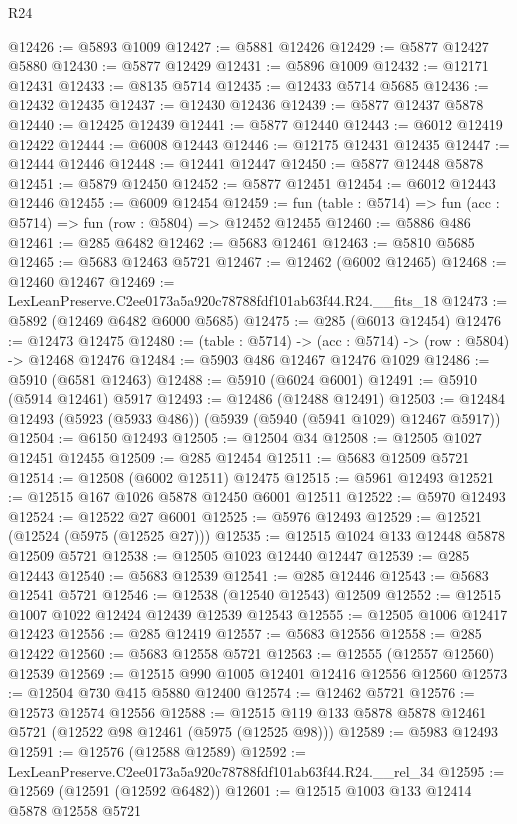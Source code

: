 \begin{lexlean}{R24}
\begin{coremodule}
@12426 := @5893 @1009
@12427 := @5881 @12426
@12429 := @5877 @12427 @5880
@12430 := @5877 @12429
@12431 := @5896 @1009
@12432 := @12171 @12431
@12433 := @8135 @5714
@12435 := @12433 @5714 @5685
@12436 := @12432 @12435
@12437 := @12430 @12436
@12439 := @5877 @12437 @5878
@12440 := @12425 @12439
@12441 := @5877 @12440
@12443 := @6012 @12419 @12422
@12444 := @6008 @12443
@12446 := @12175 @12431 @12435
@12447 := @12444 @12446
@12448 := @12441 @12447
@12450 := @5877 @12448 @5878
@12451 := @5879 @12450
@12452 := @5877 @12451
@12454 := @6012 @12443 @12446
@12455 := @6009 @12454
@12459 := fun (table : @5714) => fun (acc : @5714) => fun (row : @5804) => @12452 @12455
@12460 := @5886 @486
@12461 := @285 @6482
@12462 := @5683 @12461
@12463 := @5810 @5685
@12465 := @5683 @12463 @5721
@12467 := @12462 (@6002 @12465)
@12468 := @12460 @12467
@12469 := LexLeanPreserve.C2ee0173a5a920c78788fdf101ab63f44.R24.__fits_18
@12473 := @5892 (@12469 @6482 @6000 @5685)
@12475 := @285 (@6013 @12454)
@12476 := @12473 @12475
@12480 := (table : @5714) -> (acc : @5714) -> (row : @5804) -> @12468 @12476
@12484 := @5903 @486 @12467 @12476 @1029
@12486 := @5910 (@6581 @12463)
@12488 := @5910 (@6024 @6001)
@12491 := @5910 (@5914 @12461) @5917
@12493 := @12486 (@12488 @12491)
@12503 := @12484 @12493 (@5923 (@5933 @486)) (@5939 (@5940 (@5941 @1029) @12467 @5917))
@12504 := @6150 @12493
@12505 := @12504 @34
@12508 := @12505 @1027 @12451 @12455
@12509 := @285 @12454
@12511 := @5683 @12509 @5721
@12514 := @12508 (@6002 @12511) @12475
@12515 := @5961 @12493
@12521 := @12515 @167 @1026 @5878 @12450 @6001 @12511
@12522 := @5970 @12493
@12524 := @12522 @27 @6001
@12525 := @5976 @12493
@12529 := @12521 (@12524 (@5975 (@12525 @27)))
@12535 := @12515 @1024 @133 @12448 @5878 @12509 @5721
@12538 := @12505 @1023 @12440 @12447
@12539 := @285 @12443
@12540 := @5683 @12539
@12541 := @285 @12446
@12543 := @5683 @12541 @5721
@12546 := @12538 (@12540 @12543) @12509
@12552 := @12515 @1007 @1022 @12424 @12439 @12539 @12543
@12555 := @12505 @1006 @12417 @12423
@12556 := @285 @12419
@12557 := @5683 @12556
@12558 := @285 @12422
@12560 := @5683 @12558 @5721
@12563 := @12555 (@12557 @12560) @12539
@12569 := @12515 @990 @1005 @12401 @12416 @12556 @12560
@12573 := @12504 @730 @415 @5880 @12400
@12574 := @12462 @5721
@12576 := @12573 @12574 @12556
@12588 := @12515 @119 @133 @5878 @5878 @12461 @5721 (@12522 @98 @12461 (@5975 (@12525 @98)))
@12589 := @5983 @12493
@12591 := @12576 (@12588 @12589)
@12592 := LexLeanPreserve.C2ee0173a5a920c78788fdf101ab63f44.R24.__rel_34
@12595 := @12569 (@12591 (@12592 @6482))
@12601 := @12515 @1003 @133 @12414 @5878 @12558 @5721

\end{coremodule}
\end{lexlean}
